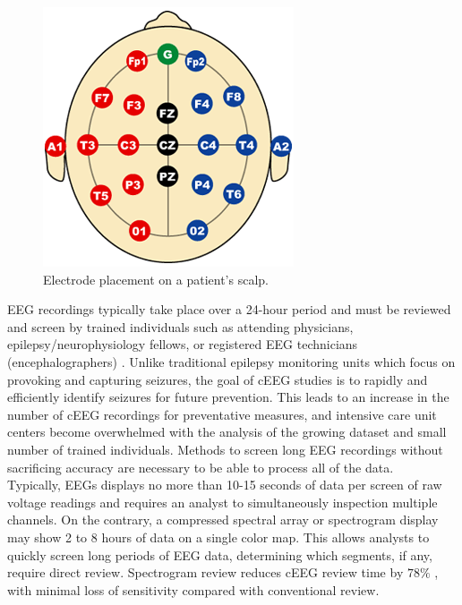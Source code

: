 \begin{figure}[h]
\begin{center}
\includegraphics[scale=0.5]{./img/electrodes.png}
\caption{Electrode placement on a patient's scalp.}
\label{fig:electrodes}
\end{center}
\end{figure}

EEG recordings typically take place over a 24-hour period and must be reviewed
and screen by trained individuals such as attending physicians,
epilepsy/neurophysiology fellows, or registered EEG technicians
(encephalographers) \cite{ceeg-3}. Unlike traditional epilepsy monitoring units
which focus on provoking and capturing seizures, the goal of cEEG studies is to
rapidly and efficiently identify seizures for future prevention. This leads to
an increase in the number of cEEG recordings for preventative measures, and
intensive care unit centers become overwhelmed with the analysis of the growing
dataset and small number of trained individuals. Methods to screen long EEG
recordings without sacrificing accuracy are necessary to be able to process all
of the data. \\

Typically, EEGs displays no more than 10-15 seconds of data per screen of raw
voltage readings and requires an analyst to simultaneously inspection multiple
channels. On the contrary, a compressed spectral array \cite{csa} or
spectrogram display may show 2 to 8 hours of data on a single color
map\cite{ceeg-3}. This allows analysts to quickly screen long periods of EEG
data, determining which segments, if any, require direct review. Spectrogram
review reduces cEEG review time by $78\%$ \cite{ceeg-2}, with minimal loss of
sensitivity compared with conventional review.\\


